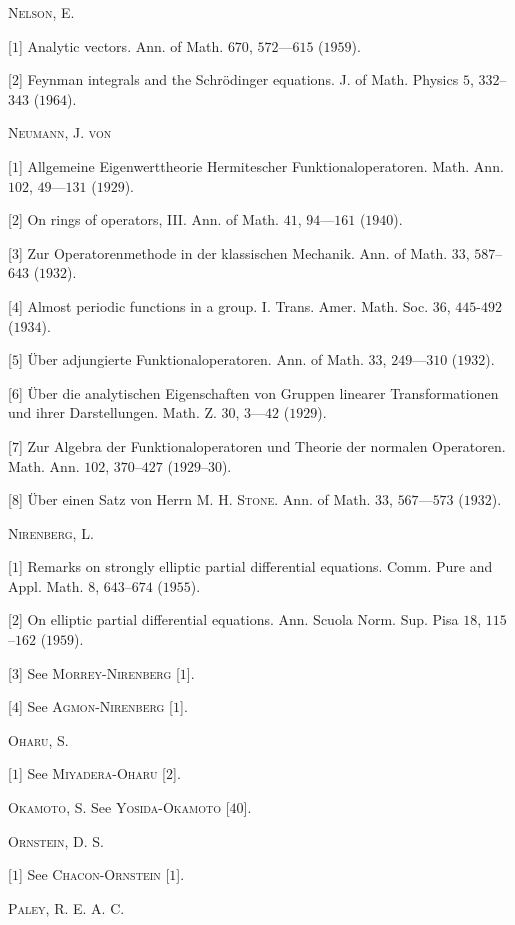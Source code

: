 \textsc{Nelson}, E. 

[$1$] Analytic vectors. Ann. of Math. $670$, $572$---$615$ ($1959$). 

[$2$] Feynman integrals and the Schrödinger equations. J. of Math. Physics $5$, $332$--$343$ ($1964$). 

\textsc{Neumann}, J. \textsc{von} 

[$1$] Allgemeine Eigenwerttheorie Hermitescher Funktionaloperatoren. Math. Ann. $102$, $49$---$131$ ($1929$). 

[$2$] On rings of operators, III. Ann. of Math. $41$, $94$---$161$ ($1940$). 

[$3$] Zur Operatorenmethode in der klassischen Mechanik. Ann. of Math. $33$, $587$--$643$ ($1932$). 

[$4$] Almost periodic functions in a group. I. Trans. Amer. Math. Soc. $36$, $445$-$492$ ($1934$). 

[$5$] Über adjungierte Funktionaloperatoren. Ann. of Math. $33$, $249$---$310$ ($1932$). 

[$6$] Über die analytischen Eigenschaften von Gruppen linearer Transformationen und ihrer Darstellungen. Math. Z. $30$, $3$---$42$ ($1929$). 

[$7$] Zur Algebra der Funktionaloperatoren und Theorie der normalen Operatoren. Math. Ann. $102$, $370$--$427$ ($1929$--$30$). 

[$8$] Über einen Satz von Herrn M. H. \textsc{Stone}. Ann. of Math. $33$, $567$---$573$ ($1932$). 

\textsc{Nirenberg}, L. 

[$1$] Remarks on strongly elliptic partial differential equations. Comm. Pure and Appl. Math. $8$, $643$--$674$ ($1955$). 

[$2$] On elliptic partial differential equations. Ann. Scuola Norm. Sup. Pisa $18$, $115$--$162$ ($1959$). 

[$3$] See \textsc{Morrey}-\textsc{Nirenberg} [$1$]. 

[$4$] See \textsc{Agmon}-\textsc{Nirenberg} [$1$]. 

\textsc{Oharu}, S. 

[$1$] See \textsc{Miyadera}-\textsc{Oharu} [$2$]. 

\textsc{Okamoto}, S. See \textsc{Yosida}-\textsc{Okamoto} [$40$]. 

\textsc{Ornstein}, D. S. 

[$1$] See \textsc{Chacon}-\textsc{Ornstein} [$1$]. 

\textsc{Paley}, R. E. A. C. 

